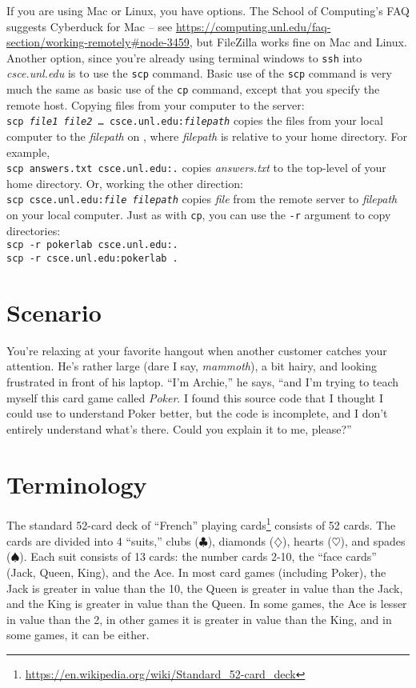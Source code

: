 If you are using Mac or Linux, you have options. The School of Computing's FAQ
suggests Cyberduck for Mac -- see
\url{https://computing.unl.edu/faq-section/working-remotely#node-3459}, but
FileZilla works fine on Mac and Linux. Another option, since you're already
using terminal windows to \texttt{ssh} into \textit{csce.unl.edu} is to use
the \texttt{scp} command. Basic use of the \texttt{scp} command is very much
the same as basic use of the \texttt{cp} command, except that you specify the
remote host. Copying files from your computer to the server: \\
\texttt{scp \textit{file1} \textit{file2} \dots
csce.unl.edu:\textit{filepath}} copies the files from your local computer to
the \textit{filepath} on \runtimeenvironment, where \textit{filepath} is
relative to your home directory. For example, \\
\texttt{scp answers.txt csce.unl.edu:.} copies \textit{answers.txt} to the
top-level of your home directory. Or, working the other direction: \\
\texttt{scp csce.unl.edu:\textit{file} \textit{filepath}} copies \textit{file}
from the remote server to \textit{filepath} on your local computer. Just as
with \texttt{cp}, you can use the \texttt{-r} argument to copy directories: \\
\texttt{scp -r pokerlab csce.unl.edu:.} \\
\texttt{scp -r csce.unl.edu:pokerlab .}

\section{Scenario}

You're relaxing at your favorite hangout when another customer catches your
attention. He's rather large (dare I say, \textit{mammoth}), a bit hairy, and
looking frustrated in front of his laptop. ``I'm Archie,'' he says, ``and I'm
trying to teach myself this card game called \textit{Poker}. I found this
source code that I thought I could use to understand Poker better, but the code
is incomplete, and I don't entirely understand what's there. Could you explain
it to me, please?''

\section{Terminology}

The standard 52-card deck of ``French'' playing
cards\footnote{\url{https://en.wikipedia.org/wiki/Standard_52-card_deck}}
consists of 52 cards. The cards are divided into 4 ``suits,'' clubs
($\clubsuit$), diamonds ($\diamondsuit$), hearts ($\heartsuit$), and spades
($\spadesuit$). Each suit consists of 13 cards: the number cards 2-10, the
``face cards'' (Jack, Queen, King), and the Ace. In most card games (including
Poker), the Jack is greater in value than the 10, the Queen is greater in value
than the Jack, and the King is greater in value than the Queen. In some games,
the Ace is lesser in value than the 2, in other games it is greater in value
than the King, and in some games, it can be either.

